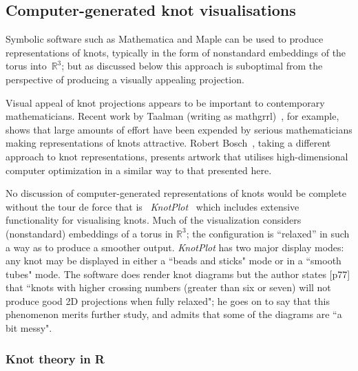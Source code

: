 \documentclass{birkjour}
\theoremstyle{definition}
\theoremstyle{remark}
\numberwithin{equation}{section}
\begin{document}
\subsection{Computer-generated knot visualisations}

Symbolic software such as Mathematica and Maple can be used to produce
representations of knots, typically in the form of nonstandard
embeddings of the torus into~$\mathbb{R}^3$; but as discussed below
this approach is suboptimal from the perspective of producing a
visually appealing projection.

Visual appeal of knot projections appears to be important to
contemporary mathematicians.  Recent work by Taalman (writing as
mathgrrl)~\cite{taalman2019}, for example, shows that large amounts of
effort have been expended by serious mathematicians making
representations of knots attractive.  Robert Bosch~\cite{bosch2010},
taking a different approach to knot representations, presents artwork
that utilises high-dimensional computer optimization in a similar way
to that presented here.

No discussion of computer-generated representations of knots would be
complete without the tour de force that is~{\em
  KnotPlot}~\cite{scharein1997,scharein1998} which includes extensive
functionality for visualising knots.  Much of the visualization
considers (nonstandard) embeddings of a torus in $\mathbb{R}^3$; the
configuration is ``relaxed'' in such a way as to produce a smoother
output.  {\em KnotPlot} has two major display modes: any knot may be
displayed in either a ``beads and sticks" mode or in a ``smooth tubes"
mode.  The software does render knot diagrams but the author states
[p77] that ``knots with higher crossing numbers (greater than six or
seven) will not produce good 2D projections when fully relaxed"; he
goes on to say that this phenomenon merits further study, and admits
that some of the diagrams are ``a bit messy".


\subsubsection{Knot theory in R}
\end{document}
